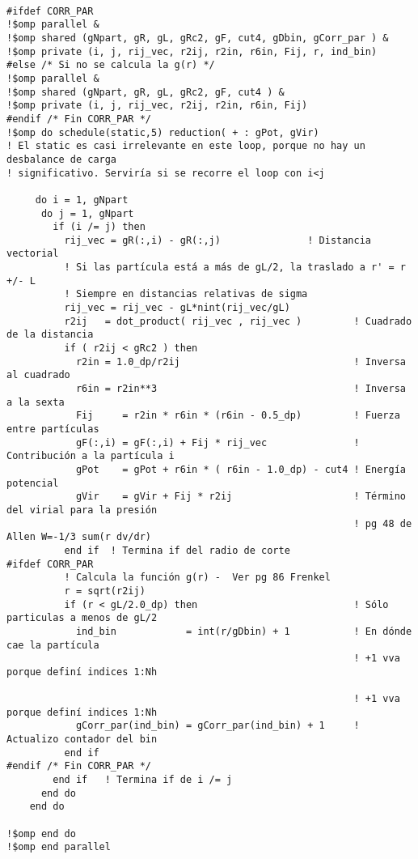\begingroup
    \fontsize{8pt}{10pt}\selectfont
\begin{verbatim}

#ifdef CORR_PAR
!$omp parallel &
!$omp shared (gNpart, gR, gL, gRc2, gF, cut4, gDbin, gCorr_par ) &
!$omp private (i, j, rij_vec, r2ij, r2in, r6in, Fij, r, ind_bin)
#else /* Si no se calcula la g(r) */
!$omp parallel &
!$omp shared (gNpart, gR, gL, gRc2, gF, cut4 ) &
!$omp private (i, j, rij_vec, r2ij, r2in, r6in, Fij)
#endif /* Fin CORR_PAR */
!$omp do schedule(static,5) reduction( + : gPot, gVir)
! El static es casi irrelevante en este loop, porque no hay un desbalance de carga
! significativo. Serviría si se recorre el loop con i<j

     do i = 1, gNpart
      do j = 1, gNpart
        if (i /= j) then
          rij_vec = gR(:,i) - gR(:,j)               ! Distancia vectorial
          ! Si las partícula está a más de gL/2, la traslado a r' = r +/- L
          ! Siempre en distancias relativas de sigma
          rij_vec = rij_vec - gL*nint(rij_vec/gL)
          r2ij   = dot_product( rij_vec , rij_vec )         ! Cuadrado de la distancia
          if ( r2ij < gRc2 ) then
            r2in = 1.0_dp/r2ij                              ! Inversa al cuadrado
            r6in = r2in**3                                  ! Inversa a la sexta
            Fij     = r2in * r6in * (r6in - 0.5_dp)         ! Fuerza entre partículas
            gF(:,i) = gF(:,i) + Fij * rij_vec               ! Contribución a la partícula i
            gPot    = gPot + r6in * ( r6in - 1.0_dp) - cut4 ! Energía potencial
            gVir    = gVir + Fij * r2ij                     ! Término del virial para la presión
                                                            ! pg 48 de Allen W=-1/3 sum(r dv/dr)
          end if  ! Termina if del radio de corte
#ifdef CORR_PAR
          ! Calcula la función g(r) -  Ver pg 86 Frenkel
          r = sqrt(r2ij)
          if (r < gL/2.0_dp) then                           ! Sólo particulas a menos de gL/2
            ind_bin            = int(r/gDbin) + 1           ! En dónde cae la partícula
                                                            ! +1 vva porque definí indices 1:Nh

                                                            ! +1 vva porque definí indices 1:Nh
            gCorr_par(ind_bin) = gCorr_par(ind_bin) + 1     ! Actualizo contador del bin
          end if
#endif /* Fin CORR_PAR */
        end if   ! Termina if de i /= j
      end do
    end do

!$omp end do
!$omp end parallel

\end{verbatim}
\endgroup


